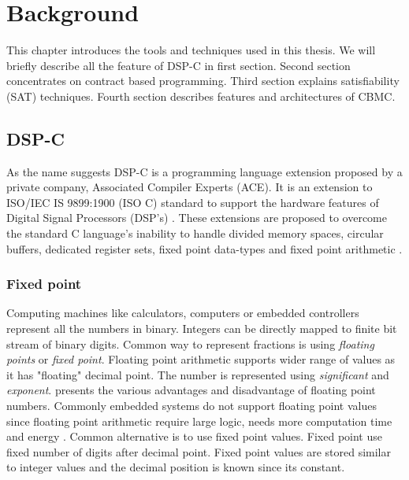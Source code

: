 


\chapter{Background} \label{chap:background}

This chapter introduces the tools and techniques used in this thesis. We will briefly describe all the feature of DSP-C in first section. Second section concentrates on contract based programming. Third section explains satisfiability (SAT) techniques. Fourth section describes features and architectures of CBMC.


\section{DSP-C}\label{sec:back:dspc}

As the name suggests DSP-C is a programming language extension proposed by a private company, Associated Compiler Experts (ACE). It is an extension to ISO/IEC IS 9899:1900 (ISO C) standard to support the hardware features of Digital Signal Processors (DSP's) \cite{website:dspc:specification}. These extensions are proposed to overcome the standard C language's inability to handle divided memory spaces, circular buffers, dedicated register sets, fixed point data-types and fixed point arithmetic \cite{dspcbenifits}.

\subsection{Fixed point}

Computing machines like calculators, computers or embedded controllers represent all the numbers in binary. Integers can be directly mapped to finite bit stream of binary digits. Common way to represent fractions is using \emph{floating points} or \emph{fixed point}. Floating point arithmetic supports wider range of values as it has "floating" decimal point. The number is represented using \emph{significant} and \emph{exponent}. \cite{overton2001numerical} presents the various advantages and disadvantage of floating point numbers. Commonly embedded systems do not support floating point values since floating point arithmetic require large logic, needs more computation time and energy \cite{tiwari1995power}. Common alternative is to use fixed point values. Fixed point use fixed number of digits after decimal point. Fixed point values are stored similar to integer values and the decimal position is known since its constant.

